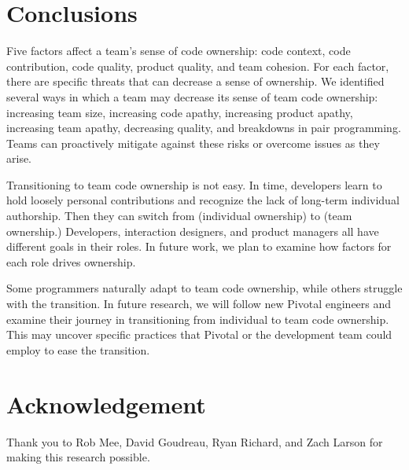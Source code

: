 \section{Conclusions}
Five factors affect a team's sense of code ownership: code context, code contribution, code quality, product quality, and team cohesion. For each factor, there are specific threats that can decrease a sense of ownership. We identified several ways in which a team may decrease its sense of team code ownership: increasing team size, increasing code apathy, increasing product apathy, increasing team apathy, decreasing quality, and breakdowns in pair programming. Teams can proactively mitigate against these risks or overcome issues as they arise. 

Transitioning to team code ownership is not easy. In time, developers learn to hold loosely personal contributions and recognize the lack of long-term individual authorship. Then they can switch from  (individual ownership) to  (team ownership.) 
Developers, interaction designers, and product managers all have different goals in their roles. In future work, we plan to examine how factors for each role drives ownership.

Some programmers naturally adapt to team code ownership, while others struggle with the transition. In future research, we will follow new Pivotal engineers and examine their journey in transitioning from individual to team code ownership. This may uncover specific practices that Pivotal or the development team could employ to ease the transition. 


\section{Acknowledgement}

Thank you to Rob Mee, David Goudreau, Ryan Richard, and Zach Larson for making this research possible.
